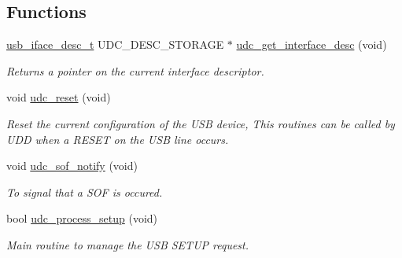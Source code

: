 \subsection*{\-Functions}
\begin{DoxyCompactItemize}
\item 
\hyperlink{structusb__iface__desc__t}{usb\-\_\-iface\-\_\-desc\-\_\-t} \-U\-D\-C\-\_\-\-D\-E\-S\-C\-\_\-\-S\-T\-O\-R\-A\-G\-E $\ast$ \hyperlink{group__udc__group_ga7da79665b18d9c63db481ec59987ce66}{udc\-\_\-get\-\_\-interface\-\_\-desc} (void)
\begin{DoxyCompactList}\small\item\em \-Returns a pointer on the current interface descriptor. \end{DoxyCompactList}\item 
void \hyperlink{group__udc__group_ga11a32ff7928ba06d3b59e95e0a2b7a92}{udc\-\_\-reset} (void)
\begin{DoxyCompactList}\small\item\em \-Reset the current configuration of the \-U\-S\-B device, \-This routines can be called by \-U\-D\-D when a \-R\-E\-S\-E\-T on the \-U\-S\-B line occurs. \end{DoxyCompactList}\item 
void \hyperlink{group__udc__group_ga4afae313045f44b5eb4c60957ab8ef4e}{udc\-\_\-sof\-\_\-notify} (void)
\begin{DoxyCompactList}\small\item\em \-To signal that a \-S\-O\-F is occured. \end{DoxyCompactList}\item 
bool \hyperlink{group__udc__group_ga58c2916d7984e0e5b2143cadf4af6080}{udc\-\_\-process\-\_\-setup} (void)
\begin{DoxyCompactList}\small\item\em \-Main routine to manage the \-U\-S\-B \-S\-E\-T\-U\-P request. \end{DoxyCompactList}\end{DoxyCompactItemize}
